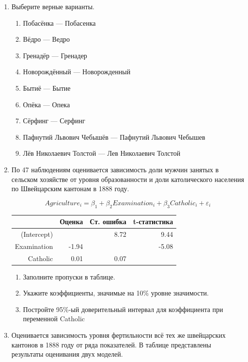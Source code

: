 \documentclass[12pt, a4paper]{article}\usepackage[]{graphicx}\usepackage[]{color}
\begin{document}
\begin{enumerate}
\item Выберите верные варианты.

\begin{enumerate}
\item Побасёнка — Побасенка
\item Вёдро — Ведро
\item Гренадёр — Гренадер
\item Новорождённый — Новорожденный
\item Бытиё — Бытие
\item Опёка — Опека
\item Сёрфинг — Серфинг
\item Пафнутий Львович Чебышёв — Пафнутий Львович Чебышев
\item Лёв Николаевич Толстой — Лев Николаевич Толстой
\end{enumerate}


\item По 47 наблюдениям оценивается зависимость доли мужчин занятых в сельском хозяйстве от уровня образованности и доли католического населения по Швейцарским кантонам в 1888 году.

\[Agriculture_i=\beta_1+\beta_2 Examination_i+\beta_3 Catholic_i+\varepsilon_i\]



\begin{table}[ht]
\centering
\begin{tabular}{rrrr}
  \hline
 & Оценка & Ст. ошибка & t-статистика \\ 
  \hline
(Intercept) &  & 8.72 & 9.44 \\ 
  Examination & -1.94 &  & -5.08 \\ 
  Catholic & 0.01 & 0.07 &  \\ 
   \hline
\end{tabular}
\end{table}


\begin{enumerate}
\item Заполните пропуски в таблице.
\item Укажите коэффициенты, значимые на 10\% уровне значимости.
\item Постройте 95\%-ый доверительный интервал для коэффициента при переменной Catholic
\end{enumerate}


\item Оценивается зависимость уровня фертильности всё тех же швейцарских кантонов в 1888 году от ряда показателей. В таблице представлены результаты оценивания двух моделей.


\end{enumerate}
\end{document}
